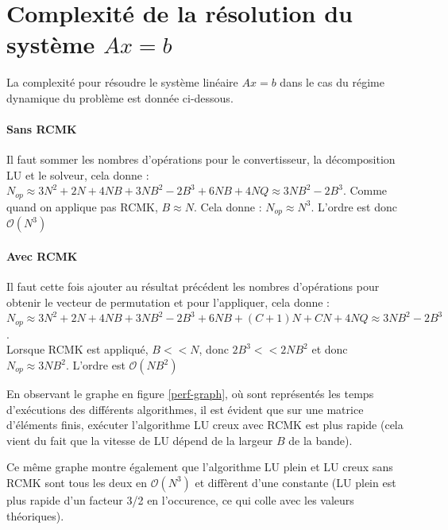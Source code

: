 \documentclass[11pt]{article}
\begin{document}
\section{Complexité de la résolution du système $Ax = b$}
\vspace{-10pt}
La complexité pour résoudre le système linéaire $Ax = b$ dans le cas du régime dynamique du problème est donnée ci-dessous.
\vspace{-8pt}

\paragraph{Sans RCMK} Il faut sommer les nombres d'opérations pour le convertisseur, la décomposition LU et le solveur, cela donne : $N_{op} \approx 3N^2 + 2N + 4NB + 3NB^2 - 2B^3 + 6NB + 4NQ \approx  3NB^2 - 2B^3$. Comme quand on applique pas RCMK, $B \approx N$. Cela donne : $N_{op} \approx N^3$. L'ordre est donc $\mathcal{O}(N^3)$
\vspace{-8pt}

\paragraph{Avec RCMK} Il faut cette fois ajouter au résultat précédent les nombres d'opérations pour obtenir le vecteur de permutation et pour l'appliquer, cela donne : $N_{op} \approx 3N^2 + 2N + 4NB + 3NB^2 - 2B^3 + 6NB + (C+1)N + CN + 4NQ \approx   3NB^2 - 2B^3$. \\Lorsque RCMK est appliqué, $B << N$, donc $2B^3 << 2NB^2$ et donc $N_{op} \approx 3NB^2$. L'ordre est $\mathcal{O}(NB^2)$\\
\vspace{-8pt}

En observant le graphe en figure \ref{perf-graph}, où sont représentés les temps d'exécutions des différents algorithmes, il est évident que sur une matrice d'éléments finis, exécuter l'algorithme LU creux avec RCMK est plus rapide (cela vient du fait que la vitesse de LU dépend de la largeur $B$ de la bande). \\
\vspace{-8pt}

Ce même graphe montre également que l'algorithme LU plein et LU creux sans RCMK sont tous les deux en $\mathcal{O}(N^3)$ et diffèrent d'une constante (LU plein est plus rapide d'un facteur 3/2 en l'occurence, ce qui colle avec les valeurs théoriques). \\
\end{document}
